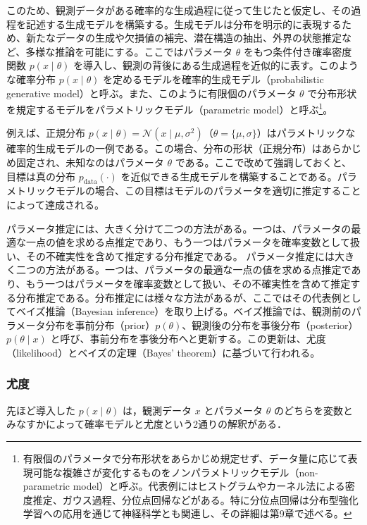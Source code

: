 \documentclass[titlepage]{ltjsbook}
\begin{document}
このため、観測データがある確率的な生成過程に従って生じたと仮定し、その過程を記述する生成モデルを構築する。生成モデルは分布を明示的に表現するため、新たなデータの生成や欠損値の補完、潜在構造の抽出、外界の状態推定など、多様な推論を可能にする。ここではパラメータ $\theta$ をもつ条件付き確率密度関数 $p(x \mid \theta)$ を導入し、観測の背後にある生成過程を近似的に表す。このような確率分布 $p(x \mid \theta)$ を定めるモデルを確率的生成モデル（probabilistic generative model）と呼ぶ。また、このように有限個のパラメータ $\theta$ で分布形状を規定するモデルをパラメトリックモデル（parametric model）と呼ぶ\footnote{有限個のパラメータで分布形状をあらかじめ規定せず、データ量に応じて表現可能な複雑さが変化するものをノンパラメトリックモデル（non-parametric model）と呼ぶ。代表例にはヒストグラムやカーネル法による密度推定、ガウス過程、分位点回帰などがある。特に分位点回帰は分布型強化学習への応用を通じて神経科学とも関連し、その詳細は第9章で述べる。}。

例えば、正規分布 $p(x \mid \theta) = \mathcal{N}(x \mid \mu, \sigma^2)$（$\theta = \{\mu, \sigma\}$）はパラメトリックな確率的生成モデルの一例である。この場合、分布の形状（正規分布）はあらかじめ固定され、未知なのはパラメータ $\theta$ である。ここで改めて強調しておくと、目標は真の分布 $p_{\mathrm{data}}(\cdot)$ を近似できる生成モデルを構築することである。パラメトリックモデルの場合、この目標はモデルのパラメータを適切に推定することによって達成される。

パラメータ推定には、大きく分けて二つの方法がある。一つは、パラメータの最適な一点の値を求める点推定であり、もう一つはパラメータを確率変数として扱い、その不確実性を含めて推定する分布推定である。
パラメータ推定には大きく二つの方法がある。一つは、パラメータの最適な一点の値を求める点推定であり、もう一つはパラメータを確率変数として扱い、その不確実性を含めて推定する分布推定である。分布推定には様々な方法があるが、ここではその代表例としてベイズ推論（Bayesian inference）を取り上げる。ベイズ推論では、観測前のパラメータ分布を事前分布（prior）$p(\theta)$、観測後の分布を事後分布（posterior）$p(\theta \mid x)$ と呼び、事前分布を事後分布へと更新する。この更新は、尤度（likelihood）とベイズの定理（Bayes’ theorem）に基づいて行われる。

\subsubsection{尤度}
先ほど導入した $p(x \mid \theta)$ は，観測データ $x$ とパラメータ $\theta$ のどちらを変数とみなすかによって確率モデルと尤度という2通りの解釈がある．
\end{document}
